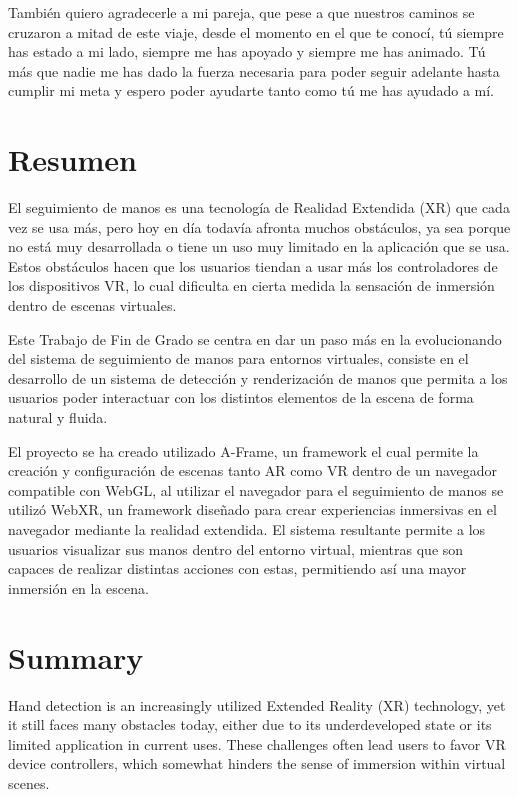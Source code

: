 \documentclass[a4paper, 12pt]{book}
\begin{document}
También quiero agradecerle a mi pareja, que pese a que nuestros caminos se cruzaron a mitad de este viaje, desde el momento en el que te conocí, tú siempre has estado a mi lado, siempre me has apoyado y siempre me has animado. Tú más que nadie me has dado la fuerza necesaria para poder seguir adelante hasta cumplir mi meta y espero poder ayudarte tanto como tú me has ayudado a mí. 


\chapter*{Resumen}
El seguimiento de manos es una tecnología de Realidad Extendida (XR) que cada vez se usa más, pero hoy en día todavía afronta muchos obstáculos, ya sea porque no está muy desarrollada o tiene un uso muy limitado en la aplicación que se usa. Estos obstáculos hacen que los usuarios tiendan a usar más los controladores de los dispositivos VR, lo cual dificulta en cierta medida la sensación de inmersión dentro de escenas virtuales. 

Este Trabajo de Fin de Grado se centra en dar un paso más en la evolucionando del sistema de seguimiento de manos para entornos virtuales, consiste en el desarrollo de un sistema de detección y renderización de manos que permita a los usuarios 
poder interactuar con los distintos elementos de la escena de forma natural y fluida.

El proyecto se ha creado utilizado A-Frame, un framework el cual permite la creación y configuración de escenas tanto AR como VR dentro de un navegador compatible con WebGL, al utilizar el navegador para el seguimiento de manos se utilizó WebXR, un framework diseñado para crear experiencias inmersivas en el navegador mediante la realidad extendida. El sistema resultante permite a los usuarios visualizar sus manos dentro del entorno virtual, mientras que son capaces de realizar distintas acciones con estas, permitiendo así una mayor inmersión en la escena.


\chapter*{Summary}
Hand detection is an increasingly utilized Extended Reality (XR) technology, yet it still faces many obstacles today, either due to its underdeveloped state or its limited application in current uses. These challenges often lead users to favor VR device controllers, which somewhat hinders the sense of immersion within virtual scenes.
\end{document}
